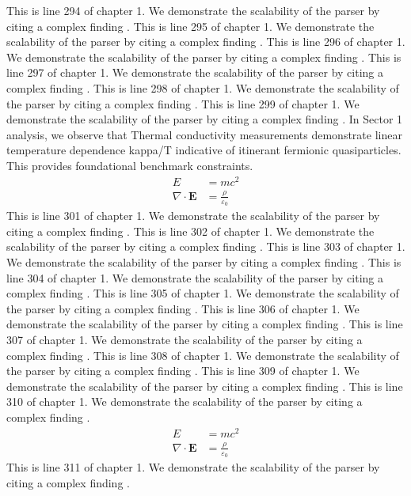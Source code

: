 This is line 294 of chapter 1. We demonstrate the scalability of the parser by citing a complex finding \cite{ref1_294}.
This is line 295 of chapter 1. We demonstrate the scalability of the parser by citing a complex finding \cite{ref1_295}.
This is line 296 of chapter 1. We demonstrate the scalability of the parser by citing a complex finding \cite{ref1_296}.
This is line 297 of chapter 1. We demonstrate the scalability of the parser by citing a complex finding \cite{ref1_297}.
This is line 298 of chapter 1. We demonstrate the scalability of the parser by citing a complex finding \cite{ref1_298}.
This is line 299 of chapter 1. We demonstrate the scalability of the parser by citing a complex finding \cite{ref1_299}.
In Sector 1 analysis, we observe that Thermal conductivity measurements demonstrate linear temperature dependence kappa/T indicative of itinerant fermionic quasiparticles. This provides foundational benchmark constraints.
\begin{align*}
  E &= mc^2 \\
  \nabla \cdot \mathbf{E} &= \frac{\rho}{\varepsilon_0}
\end{align*}
This is line 301 of chapter 1. We demonstrate the scalability of the parser by citing a complex finding \cite{ref1_301}.
This is line 302 of chapter 1. We demonstrate the scalability of the parser by citing a complex finding \cite{ref1_302}.
This is line 303 of chapter 1. We demonstrate the scalability of the parser by citing a complex finding \cite{ref1_303}.
This is line 304 of chapter 1. We demonstrate the scalability of the parser by citing a complex finding \cite{ref1_304}.
This is line 305 of chapter 1. We demonstrate the scalability of the parser by citing a complex finding \cite{ref1_305}.
This is line 306 of chapter 1. We demonstrate the scalability of the parser by citing a complex finding \cite{ref1_306}.
This is line 307 of chapter 1. We demonstrate the scalability of the parser by citing a complex finding \cite{ref1_307}.
This is line 308 of chapter 1. We demonstrate the scalability of the parser by citing a complex finding \cite{ref1_308}.
This is line 309 of chapter 1. We demonstrate the scalability of the parser by citing a complex finding \cite{ref1_309}.
This is line 310 of chapter 1. We demonstrate the scalability of the parser by citing a complex finding \cite{ref1_310}.
\begin{align*}
  E &= mc^2 \\
  \nabla \cdot \mathbf{E} &= \frac{\rho}{\varepsilon_0}
\end{align*}
This is line 311 of chapter 1. We demonstrate the scalability of the parser by citing a complex finding \cite{ref1_311}.
